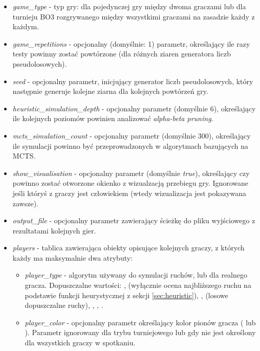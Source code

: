\documentclass[10pt]{article}
\begin{document}
\begin{itemize}
    \item \textit{game\_type} - typ gry:  dla pojedynczej gry między dwoma graczami lub  dla turnieju BO3 rozgrywanego między wszystkimi graczami na zasadzie każdy z każdym.
    \item \textit{game\_repetitions} - opcjonalny (domyślnie: 1) parametr, określający ile razy testy powinny zostać powtórzone (dla różnych ziaren generatora liczb pseudolosowych).
    \item \textit{seed} - opcjonalny parametr, inicjujący generator liczb pseudolosowych, który następnie generuje kolejne ziarna dla kolejnych powtórzeń gry.
    \item \textit{heuristic\_simulation\_depth} - opcjonalny parametr (domyślnie 6), określający ile kolejnych poziomów powinien analizować \textit{alpha-beta pruning}.
    \item \textit{mcts\_simulation\_count} - opcjonalny parametr (domyślnie 300), określający ile symulacji powinno być przeprowadzonych w algorytmach bazujących na MCTS.
    \item \textit{show\_visualisation} - opcjonalny parametr (domyślnie \textit{true}), określający czy powinno zostać otworzone okienko z wizualzacją przebiegu gry. Ignorowane jeśli któryś z graczy jest człowiekiem (wtedy wizualizacja jest pokazywana zawsze).
    \item \textit{output\_file} - opcjonalny parametr zawierający ścieżkę do pliku wyjściowego z rezultatami kolejnych gier.
    \item \textit{players} - tablica zawierająca obiekty opisujące kolejnych graczy, z których każdy ma maksymalnie dwa atrybuty:
    \begin{itemize}
        \item \textit{player\_type} - algorytm używany do symulacji ruchów, lub  dla realnego gracza. Dopuszczalne wartości: ,  (wyłącznie ocena najbliższego ruchu na podstawie funkcji heurystycznej z sekcji \ref{sec:heuristic}), ,  (losowe dopuszczalne ruchy), , , .
        \item \textit{player\_color} - opcjonalny parametr określający kolor pionów gracza ( lub ). Parametr ignorowany dla trybu turniejowego lub gdy nie jest określony dla wszystkich graczy w spotkaniu.
    \end{itemize}
\end{itemize}
\end{document}
